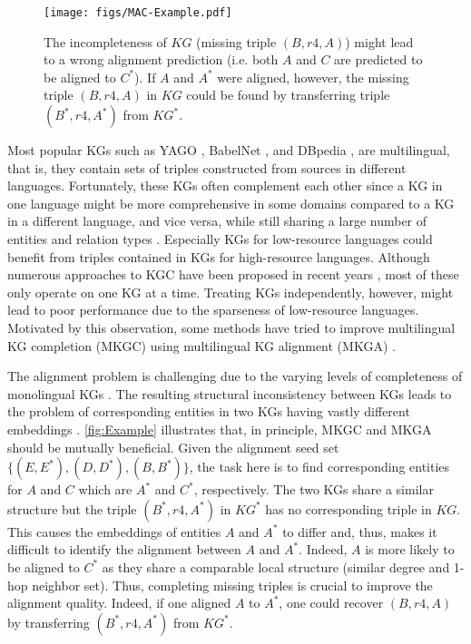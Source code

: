 \documentclass[11pt]{article}
\begin{document}
\begin{figure*}[!t]
	\centering
	\texttt{[image: figs/MAC-Example.pdf]}
    \caption{The incompleteness of $KG$ (missing triple $(B, r4, A)$) might lead to a wrong alignment prediction (i.e. both $A$ and $C$ are predicted to be aligned to $C^*$). If $A$ and $A^*$ were aligned, however, the missing triple $(B, r4, A)$ in $KG$ could be found by transferring triple $(B^*, r4, A^*)$ from $KG^*$.}
    \label{fig:Example}
\end{figure*}




Most popular KGs such as YAGO \cite{Suchanek:2007}, BabelNet \cite{navigli-ponzetto-2010-babelnet}, and DBpedia \cite{LehmannIJJKMHMK15}, are multilingual, that is, they contain sets of triples constructed from sources in different languages. Fortunately, these KGs often complement each other since a KG in one language might be more comprehensive in some domains compared to a KG in a different language, and vice versa, while still sharing a large number of entities and relation types \cite{sun2020dual}. Especially KGs for low-resource languages could benefit from triples contained in KGs for high-resource languages. Although numerous approaches to KGC have been proposed in recent years \cite{bordes2013translating, dettmers2018convolutional, vashishth2019composition}, most of these only operate on one KG at a time. Treating KGs independently, however, might lead to poor performance due to the sparseness of low-resource languages. Motivated by this observation, some methods have tried to improve multilingual KG completion (MKGC) using multilingual KG alignment (MKGA) \cite{chen2020multilingual, singh2021multilingual, huang2022multilingual}.


The alignment problem is challenging due to the varying levels of completeness of monolingual KGs \cite{sun2020benchmarking}. The resulting structural inconsistency between KGs leads to the problem of corresponding entities in two KGs having vastly different embeddings \citep{jumping_knowledge}. 
\autoref{fig:Example} illustrates that, in principle, MKGC and MKGA should be mutually beneficial. Given the alignment seed set $\{(E, E^*), (D, D^*), (B, B^*) \}$, the task here is to find corresponding entities for $A$ and $C$ which are $A^*$ and $C^*$, respectively. The two KGs share a similar structure but the triple $( B^*, r4, A^*)$ in $KG^*$  has no corresponding triple in $KG$. This causes the embeddings of entities $A$ and $A^*$ to differ and, thus, makes it difficult to identify the alignment between $A$ and $A^*$. Indeed, $A$ is more likely to be aligned to $C^*$ as they share a comparable local structure (similar degree and 1-hop neighbor set). Thus, completing missing triples is crucial to improve the alignment quality. Indeed, if one aligned $A$ to $A^*$, one could recover $(B, r4, A)$ by transferring  $(B^*, r4, A^*)$ from $KG^*$.
\end{document}

